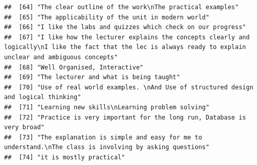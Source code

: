 \documentclass[
]{article}
\begin{document}
\begin{verbatim}
##  [64] "The clear outline of the work\nThe practical examples"                                                                                                                                                                                            
##  [65] "The applicability of the unit in modern world"                                                                                                                                                                                                    
##  [66] "I like the labs and quizzes which check on our progress"                                                                                                                                                                                          
##  [67] "I like how the lecturer explains the concepts clearly and logically\nI like the fact that the lec is always ready to explain unclear and ambiguous concepts"                                                                                      
##  [68] "Well Organised, Interactive"                                                                                                                                                                                                                      
##  [69] "The lecturer and what is being taught"                                                                                                                                                                                                            
##  [70] "Use of real world examples. \nAnd Use of structured design and logical thinking"                                                                                                                                                                  
##  [71] "Learning new skills\nLearning problem solving"                                                                                                                                                                                                    
##  [72] "Practice is very important for the long run, Database is very broad"                                                                                                                                                                              
##  [73] "The explanation is simple and easy for me to understand.\nThe class is involving by asking questions"                                                                                                                                             
##  [74] "it is mostly practical"                                                                                                                                                                                                                           

\end{verbatim}
\end{document}
